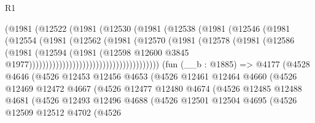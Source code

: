 \begin{lexlean}{R1}
\begin{coremodule}
                                      (@1981
                                        (@12522
                                          (@1981
                                            (@12530
                                              (@1981
                                                (@12538
                                                  (@1981
                                                    (@12546
                                                      (@1981
                                                        (@12554
                                                          (@1981
                                                            (@12562
                                                              (@1981
                                                                (@12570
                                                                  (@1981
                                                                    (@12578
                                                                      (@1981
                                                                        (@12586
                                                                          (@1981
                                                                            (@12594
                                                                              (@1981
                                                                                (@12598
                                                                                  @12600
                                                                                  @3845
                                                                                  @1977)))))))))))))))))))))))))))))))))))))))
    (fun (__b : @1885) =>
    @4177
      (@4528
        @4646
        (@4526
          @12453
          @12456
          @4653
          (@4526
            @12461
            @12464
            @4660
            (@4526
              @12469
              @12472
              @4667
              (@4526
                @12477
                @12480
                @4674
                (@4526
                  @12485
                  @12488
                  @4681
                  (@4526
                    @12493
                    @12496
                    @4688
                    (@4526
                      @12501
                      @12504
                      @4695
                      (@4526
                        @12509
                        @12512
                        @4702
                        (@4526

\end{coremodule}
\end{lexlean}
